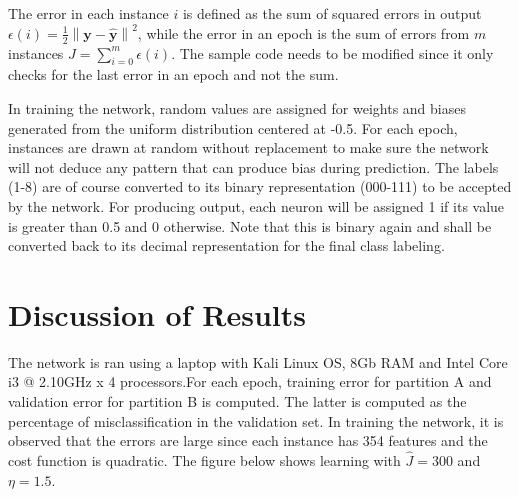 \documentclass{article}
\begin{document}
The error in each instance $i$ is defined as the sum of squared errors in output $\epsilon(i) = \frac{1}{2}\left\| \mathbf{y}-\mathbf{\hat{y}} \right\|^2$, while the error in an epoch is the sum of errors from $m$ instances $J = \sum_{i=0}^{m}\epsilon(i)$. The sample code needs to be modified since it only checks for the last error in an epoch and not the sum.

In training the network, random values are assigned for weights and biases generated from the uniform distribution centered at -0.5. For each epoch, instances are drawn at random without replacement to make sure the network will not deduce any pattern that can produce bias during prediction. The labels (1-8) are of course converted to its binary representation (000-111) to be accepted by the network. For producing output, each neuron will be assigned 1 if its value is greater than 0.5 and 0 otherwise. Note that this is binary again and shall be converted back to its decimal representation for the final class labeling.

\section{Discussion of Results}

The network is ran using a laptop with Kali Linux OS, 8Gb RAM and Intel Core i3 @ 2.10GHz x 4 processors.For each epoch, training error for partition A and validation error for partition B is computed. The latter is computed as the percentage of misclassification in the validation set. In training the network, it is observed that the errors are large since each instance has 354 features and the cost function is quadratic. The figure below shows learning with $\hat{J}=300$ and $\eta=1.5$.
\end{document}
